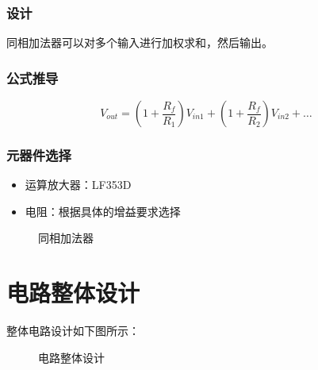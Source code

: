 \documentclass[UTF8,titlepage,a4paper]{ctexart}
\numberwithin{figure}{section}
\begin{document}
\subsubsection{设计}
同相加法器可以对多个输入进行加权求和，然后输出。

\subsubsection{公式推导}
\[ V_{out} = \left( 1 + \frac{R_f}{R_1} \right) V_{in1} + \left( 1 + \frac{R_f}{R_2} \right) V_{in2} + \ldots \]

\subsubsection{元器件选择}
\begin{itemize}
    \item 运算放大器：LF353D
    \item 电阻：根据具体的增益要求选择
\end{itemize}
\begin{figure}[H]
\centering
 \caption{同相加法器}
 \label{}
\end{figure}

\section{电路整体设计}
整体电路设计如下图所示：
\begin{figure}[H]
\centering
 \caption{电路整体设计}
 \label{}
\end{figure}
\end{document}
